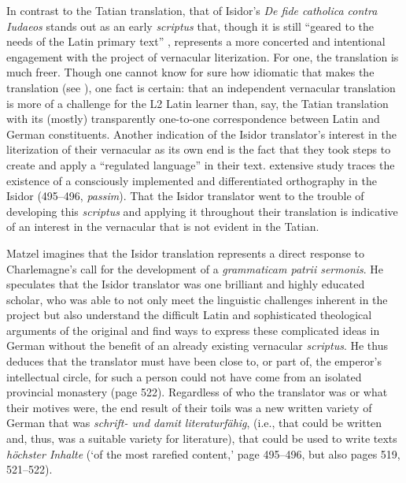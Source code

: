 In contrast to the Tatian translation, that of Isidor’s \textit{De fide catholica contra Iudaeos} stands out as an early \textit{scriptus} that, though it is still “geared to the needs of the Latin primary text” \citep[50]{Green1994}, represents a more concerted and intentional engagement with the project of vernacular literization. For one, the translation is much freer. Though one cannot know for sure how idiomatic that makes the translation (see ), one fact is certain: that an independent vernacular translation is more of a challenge for the L2 Latin learner than, say, the Tatian translation with its (mostly) transparently one-to-one correspondence between Latin and German constituents. Another indication of the Isidor translator’s interest in the literization of their vernacular as its own end is the fact that they took steps to create and apply a “regulated language” in their text.  extensive study traces the existence of a consciously implemented and differentiated orthography in the Isidor (495--496, \textit{passim}). That the Isidor translator went to the trouble of developing this \textit{scriptus} and applying it throughout their translation is indicative of an interest in the vernacular that is not evident in the Tatian.

Matzel imagines that the Isidor translation represents a direct response to Charlemagne’s call for the development of a \textit{grammaticam patrii sermonis}. He speculates that the Isidor translator was one brilliant and highly educated scholar, who was able to not only meet the linguistic challenges inherent in the project but also understand the difficult Latin and sophisticated theological arguments of the original and find ways to express these complicated ideas in  German without the benefit of an already existing vernacular \textit{scriptus}. He thus deduces that the translator must have been close to, or part of, the emperor’s intellectual circle, for such a person could not have come from an isolated provincial monastery (page 522). Regardless of who the translator was or what their motives were, the end result of their toils was a new written variety of German that was \textit{schrift- und damit literaturfähig}, (i.e., that could be written and, thus, was a suitable variety for literature), that could be used to write texts \textit{höchster Inhalte} (‘of the most rarefied content,’ page 495--496, but also pages 519, 521--522).\largerpage

